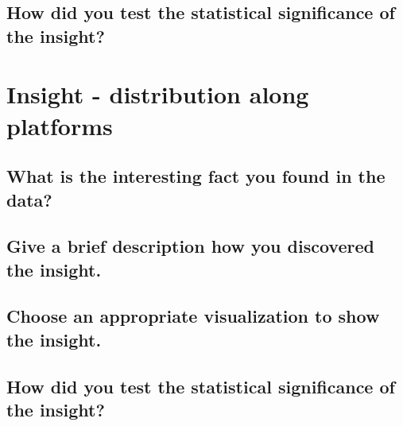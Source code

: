 \documentclass[11pt]{article}
\begin{document}
\subsection{How did you test the statistical significance of the insight?}

\section{Insight - distribution along platforms}

\subsection{What is the interesting fact you found in the data?}


\subsection{Give a brief description how you discovered the
insight.}

\subsection{Choose an appropriate visualization to show the insight.}

\subsection{How did you test the statistical significance of the insight?}
\end{document}
